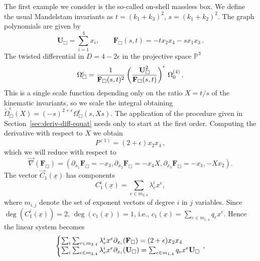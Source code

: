 \documentclass[a4paper,12pt]{article}
\numberwithin{equation}{section}
\numberwithin{figure}{section}
\begin{document}
The first example we consider is the so-called on-shell massless box. We define the usual Mandelstam invariants as $t=(k_1+k_3)^2$, $s=(k_1+k_2)^2$.  The graph polynomials are given by
\begin{equation}
	\label{e:Boxgraphpolynomials}
	\textbf{U}_{\Box}=\sum_{i=1}^4 x_i,\qquad
	\textbf{F}_{\Box}(s,t)=-t x_2x_4-sx_1x_3 \, .
\end{equation}
The twisted differential in $D=4-2\epsilon$ in the projective
space $\mathbb P^3$
\begin{equation}\label{e:OmegaBox}
	\Omega_\Box^\epsilon=   {1\over \textbf{F}_{\Box}(s,t)^2
	}\left(\textbf{U}_{\Box}^2\over \textbf{F}_{\Box}(s,t)\right)^\epsilon\,\Omega_0^{(4)} \, .
\end{equation}
This is a single scale function depending only on the ratio
$X=t/s$ of the kinematic invariants, so we scale the integral obtaining
$\tilde \Omega_\Box^\epsilon(X)=(-s)^{2+\epsilon} \Omega_\Box^\epsilon(s,X s)$.
%
The application of the procedure given in
Section~\ref{sec:deriv-diff-equat} needs only to start at the first
order. Computing the derivative with respect to $X$ we obtain 
%
\begin{equation}
P  ^{(1)}= (2+\epsilon) x_2 x_4 \, , 
\end{equation}
which we will reduce with respect to
\begin{equation}\vec\nabla(\mathbf F_\Box)=\left(
    \partial_{x_1}\textbf{F}_\Box=-x_3, \partial_{x_2}\textbf{F}_\Box=
    -x_4 X, \partial_{x_3}\textbf{F}_\Box=-x_1, -X x_2  \right).
\end{equation}
The  vector  $\vec C_{1}(\underline x)$ has components 
\begin{equation}
C^i_{1}(\underline x)= \sum_{e \in m_{2,4}} \lambda^i_e x^e,	
\end{equation}
where $m_{i,j}$ denote the set of exponent vectors of degree $i$ in $j$ variables. Since $\deg(C^i_{1}(\underline x))=2$, $\deg (c_1(\underline x))=1$, i.e., $c_1(\underline x)=\sum_{e\in m_{1,4}} q_e x^e$. Hence the linear system becomes
%
\begin{equation}\label{e:sysCFU-Box}
	\left\{\begin{array}{@{}l@{}}
\sum_i \sum_{e \in m_{2,4}} \lambda^i_e x^e \partial_{x_i}(\mathbf F_\Box) 
		=    (2+\epsilon) x_2 x_4\\
\sum_i\sum_{e \in m_{2,4}} \lambda^i_e x^e \partial_{x_i}(\mathbf U_\Box) = \sum_{e\in m_{1,4}} q_e x^e \textbf{U}_\Box 
	\end{array}\right.\,,
\end{equation}
\end{document}
